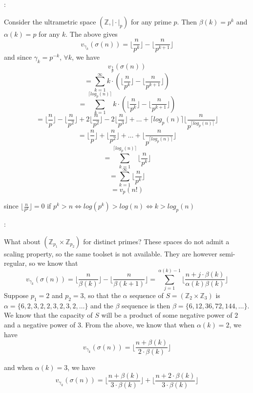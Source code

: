 :

\begin{example}
Consider the ultrametric space $(\mathbb{Z}, \rvert \cdot \lvert_p)$  for any prime $p$. Then $\beta(k)=p^k$ and $\alpha(k)=p$ for any $k$. The above gives 
\[v_{\gamma_k}(\sigma(n)) =\lfloor \frac{n}{p^{k}}\rfloor - \lfloor \frac{n}{p^{k+1}} \rfloor\]
and since $\gamma_k = p^{-k}$, $\forall k$, we have 
\[v_{\frac{1}{p}}(\sigma(n)) \]
\[ = \sum_{k=1}^{\infty} k \cdot (\lfloor \frac{n}{p^{k}}\rfloor - \lfloor \frac{n}{p^{k+1}} \rfloor) \]
\[ = \sum_{k=1}^{\lceil log_p(n) \rceil}  k \cdot (\lfloor \frac{n}{p^{k}}\rfloor - \lfloor \frac{n}{p^{k+1}} \rfloor)\]
\[ = \lfloor \frac{n}{p}\rfloor - \lfloor \frac{n}{p^{2}} \rfloor +  2\lfloor \frac{n}{p^2}\rfloor - 2\lfloor \frac{n}{p^3} \rfloor + \ldots +  \lceil log_p(n)\rceil \lfloor \frac{n}{p^{ \lceil log_p(n)\rceil}} \rfloor \]
\[ = \lfloor \frac{n}{p}\rfloor + \lfloor \frac{n}{p^2}\rfloor  + \ldots +  \lfloor \frac{n}{p^{ \lceil log_p(n)\rceil}} \rfloor \]
\[ =  \sum_{k=1}^{\lceil log_p(n) \rceil} \lfloor \frac{n}{p^{k}}\rfloor \]
\[ =  \sum_{k=1}^{\infty} \lfloor \frac{n}{p^{k}}\rfloor \]
\[= v_{p}(n!) \]

since $\lfloor \frac{n}{p^k} \rfloor = 0$ if $ p^k > n \iff log(p^k) > log(n) \iff k > log_p(n)$
\end{example}


:

What about $(\mathbb{Z}_{p_1} \times \mathbb{Z}_{p_2})$ for distinct primes? These spaces do not admit a scaling property, so the same toolset is not available. They are however semi-regular, so we know that  \[v_{\gamma_k}(\sigma(n)) =  \lfloor\frac{n}{\beta(k)}\rfloor - \lfloor\frac{n}{\beta(k+1)}\rfloor = \sum_{j=1}^{\alpha(k)-1} \lfloor \frac{n + j\cdot \beta(k)}{\alpha(k)\beta(k)} \rfloor \]
Suppose $p_1 =2$ and $p_2 =3$, so that the $\alpha$ sequence of $S = (\mathbb{Z}_{2} \times \mathbb{Z}_{3})$ is $\alpha = \{6,2,3,2,2,3,2,3,2,\ldots\}$ and the $\beta$ sequence is then $\beta = \{6,12,36,72,144,\ldots\}$. We know that the capacity of $S$ will be a product of some negative power of $2$ and a negative power of $3$.  From the above, we know that when $\alpha(k)=2$, we have 
\[v_{\gamma_k}(\sigma(n)) = \lfloor \frac{n + \beta(k)}{2\cdot \beta(k)} \rfloor\]

and when $\alpha(k)=3$, we have
\[v_{\gamma_k}(\sigma(n)) = \lfloor \frac{n + \beta(k)}{3\cdot \beta(k)} \rfloor + \lfloor \frac{n + 2\cdot \beta(k)}{3\cdot \beta(k)} \rfloor \]

